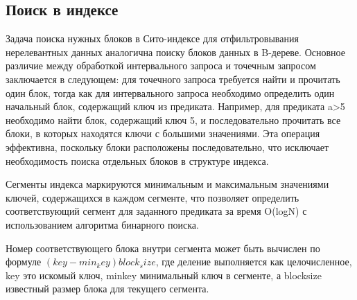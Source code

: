 \subsection{Поиск в индексе}

Задача поиска нужных блоков в Сито-индексе для отфильтровывания нерелевантных данных аналогична поиску блоков данных в B-дереве. Основное различие между обработкой интервального запроса и точечным запросом заключается в следующем: для точечного запроса требуется найти и прочитать один блок, тогда как для интервального запроса необходимо определить один начальный блок, содержащий ключ из предиката. Например, для предиката a>5 необходимо найти блок, содержащий ключ 5, и последовательно прочитать все блоки, в которых находятся ключи с большими значениями. Эта операция эффективна, поскольку блоки расположены последовательно, что исключает необходимость поиска отдельных блоков в структуре индекса.

Сегменты индекса маркируются минимальным и максимальным значениями ключей, содержащихся в каждом сегменте, что позволяет определить соответствующий сегмент для заданного предиката за время O(logN) с использованием алгоритма бинарного поиска.

Номер соответствующего блока внутри сегмента может быть вычислен по формуле $(key − min_key)  block_size$, где деление выполняется как 
целочисленное, key  это искомый ключ, minkey  минимальный ключ в сегменте, а blocksize известный размер блока для текущего сегмента.
